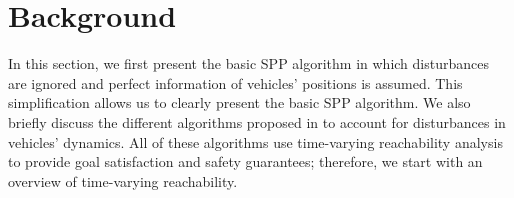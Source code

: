 \section{Background \label{sec:background}}
In this section, we first present the basic SPP algorithm \cite{Chen15c} in which disturbances are ignored and perfect information of vehicles' positions is assumed. This simplification allows us to clearly present the basic SPP algorithm. We also briefly discuss the different algorithms proposed in \cite{Bansal2017} to account for disturbances in vehicles' dynamics. All of these algorithms use time-varying reachability analysis to provide goal satisfaction and safety guarantees; therefore, we start with an overview of time-varying reachability.

%

